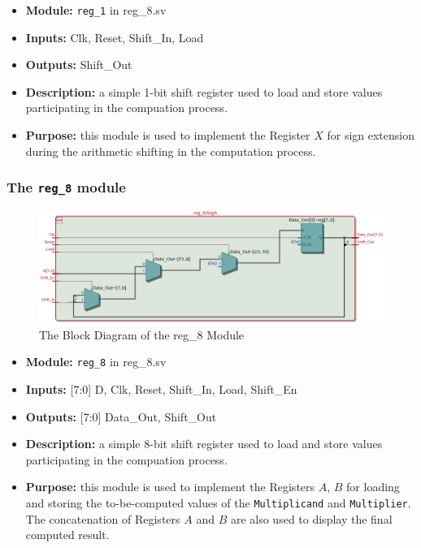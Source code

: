 \documentclass{article}
\begin{document}
\begin{itemize}
    \item \textbf{Module:} \texttt{reg\_1} in reg\_8.sv
    \item \textbf{Inputs:} Clk, Reset, Shift\_In, Load
    \item \textbf{Outputs:} Shift\_Out
    \item \textbf{Description:} a simple 1-bit shift register used to load and store values participating in the compuation process.
    \item \textbf{Purpose:} this module is used to implement the Register $X$ for sign extension during the arithmetic shifting in the computation process.
\end{itemize}


\subsubsection{The \texttt{reg\_8} module}
\begin{figure}[h]
    \centering
    \includegraphics[width=\textwidth]{reg_8.png}
    \caption{The Block Diagram of the reg\_8 Module}
    \label{fig:reg_8}
\end{figure}

\begin{itemize}
    \item \textbf{Module:} \texttt{reg\_8} in reg\_8.sv
    \item \textbf{Inputs:} [7:0] D, Clk, Reset, Shift\_In, Load, Shift\_En
    \item \textbf{Outputs:} [7:0] Data\_Out, Shift\_Out
    \item \textbf{Description:} a simple 8-bit shift register used to load and store values participating in the compuation process.
    \item \textbf{Purpose:} this module is used to implement the Registers $A$, $B$ for loading and storing the to-be-computed values of the \texttt{Multiplicand} and \texttt{Multiplier}. The concatenation of Registers $A$ and $B$ are also used to display the final computed result.
\end{itemize}
\end{document}
